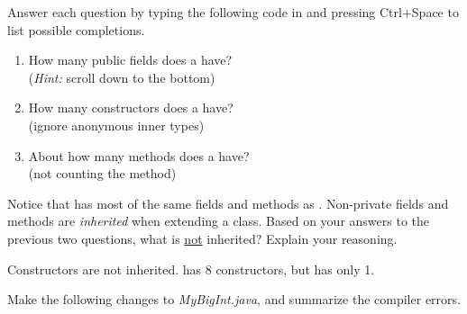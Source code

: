 \Q \label{count2}
Answer each question by typing the following code in  and pressing \textsf{Ctrl+Space} to list possible completions.

\begin{enumerate}

\item How many public fields does a  have?
\hspace{2.5em} 
\\  (\textit{Hint:} scroll down to the bottom)

\item How many constructors does a  have?
\hspace{2.5em} 
\\  (ignore anonymous inner types)

\item About how many methods does a  have?
\hspace{1.3em} 
\\  (not counting the  method)

\end{enumerate}


\Q \label{key2}
Notice that  has most of the same fields and methods as .
Non-private fields and methods are \emph{inherited} when extending a class.
Based on your answers to the previous two questions, what is \underline{not} inherited?
Explain your reasoning.

\begin{answer}[3em]
Constructors are not inherited.
 has 8 constructors, but  has only 1.
\end{answer}


\Q Make the following changes to \textit{MyBigInt.java}, and summarize the compiler errors.


